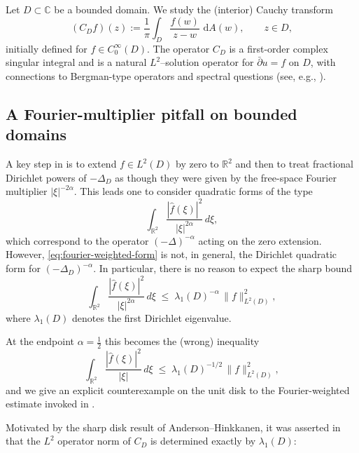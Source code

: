 \documentclass{amsart}
\newcommand{\R}{\mathbb{R}}
\newcommand{\C}{\mathbb{C}}
\newcommand{\dd}{\,\mathrm{d}}
\theoremstyle{plain}
\theoremstyle{remark}
\begin{document}
Let $D\subset\C$ be a bounded domain. We study the (interior) Cauchy transform
\begin{equation}\label{eq:Cauchy-def}
(C_D f)(z):=\frac{1}{\pi}\int_D \frac{f(w)}{z-w}\,\dd A(w),\qquad z\in D,
\end{equation}
initially defined for $f\in C_0^\infty(D)$. The operator $C_D$ is a first-order
complex singular integral and is a natural $L^2$--solution operator for
$\bar\partial u=f$ on $D$, with connections to Bergman-type operators and
spectral questions (see, e.g., \cite{Dostanic1996,KalajVujadinovic2017CMB,Vujadinovic2025}).

\subsection{A Fourier-multiplier pitfall on bounded domains}\label{subsec:pitfall}

A key step in \cite{Dostanic1996} is to extend \(f\in L^2(D)\) by zero to \(\R^2\) and
then to treat fractional Dirichlet powers of \(-\Delta_D\) as though they were given by the
free-space Fourier multiplier \( |\xi|^{-2\alpha} \). This leads one to consider quadratic
forms of the type
\begin{equation}\label{eq:fourier-weighted-form}
\int_{\R^2}\frac{|\widehat f(\xi)|^2}{|\xi|^{2\alpha}}\,d\xi,
\end{equation}
which correspond to the operator \((-\Delta)^{-\alpha}\) acting on the zero extension.
However, \eqref{eq:fourier-weighted-form} is not, in general, the Dirichlet quadratic form
for \((-\Delta_D)^{-\alpha}\). In particular, there is no reason to expect the sharp bound
\begin{equation}\label{eq:wrong-fourier-ineq}
\int_{\R^2}\frac{|\widehat f(\xi)|^2}{|\xi|^{2\alpha}}\,d\xi
\;\le\; \lambda_1(D)^{-\alpha}\,\|f\|_{L^2(D)}^2,
\end{equation}
where \(\lambda_1(D)\) denotes the first Dirichlet eigenvalue.

At the endpoint $\alpha=\tfrac12$ this becomes the (wrong) inequality
\begin{equation}\label{eq:wrong-fourier-ineq-endpoint}
\int_{\R^2}\frac{|\widehat f(\xi)|^2}{|\xi|}\,d\xi
\;\le\; \lambda_1(D)^{-1/2}\,\|f\|_{L^2(D)}^2,
\end{equation}
and we give an explicit counterexample on the unit disk to the Fourier-weighted estimate
invoked in \cite[Lemma~2.2]{Dostanic1996}.


Motivated by the sharp disk result of Anderson--Hinkkanen, it was asserted in
\cite{Dostanic1996} that the $L^2$ operator norm of $C_D$ is determined exactly
by $\lambda_1(D)$:
\end{document}
